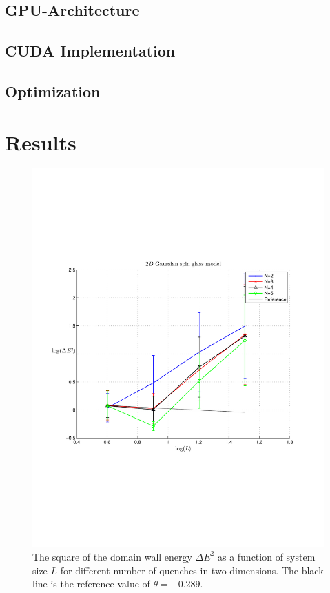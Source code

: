 \documentclass[paper=a4, fontsize=11pt]{scrartcl} %
\numberwithin{equation}{section} %
\numberwithin{figure}{section} %
\numberwithin{table}{section} %
\begin{document}
\subsection{GPU-Architecture}

\subsection{CUDA Implementation}

\subsection{Optimization}

\section{Results}
\label{sec:results}

\begin{figure}[hbtp]
\centering
\includegraphics[width=\textwidth]{spinglass2D.pdf}
\caption{The square of the domain wall energy $\Delta E ^ 2$ as a function of system size $L$ for different number of quenches in two dimensions. The black line is the reference value of $\theta=-0.289$.}
\label{fig:E_2D}
\end{figure}
\end{document}
